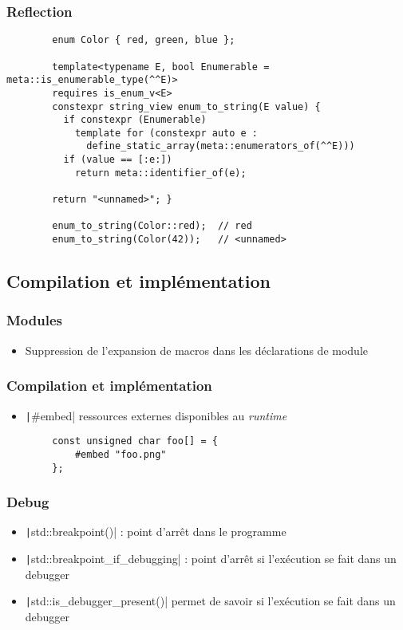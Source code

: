 \documentclass[C++.tex]{subfiles}
\begin{document}
\begin{frame}[fragile]
	\frametitle{Reflection}
	\begin{verbatim}
		enum Color { red, green, blue };

		template<typename E, bool Enumerable = meta::is_enumerable_type(^^E)>
		requires is_enum_v<E>
		constexpr string_view enum_to_string(E value) {
		  if constexpr (Enumerable)
		    template for (constexpr auto e :
		      define_static_array(meta::enumerators_of(^^E)))
		  if (value == [:e:])
		    return meta::identifier_of(e);

		return "<unnamed>"; }

		enum_to_string(Color::red);  // red
		enum_to_string(Color(42));   // <unnamed>
	\end{verbatim}
\end{frame}

\subsection*{Compilation et implémentation}
\begin{frame}[fragile]
	\frametitle{Modules}
	\begin{itemize}
		\item Suppression de l'expansion de macros dans les déclarations de module
	\end{itemize}

\end{frame}

\begin{frame}[fragile]
	\frametitle{Compilation et implémentation}
	\begin{itemize}
		\item \texttt|#embed| ressources externes disponibles au \textit{runtime}
	\end{itemize}

	\begin{verbatim}
		const unsigned char foo[] = {
			#embed "foo.png"
		};
	\end{verbatim}

\end{frame}

\begin{frame}[fragile]
	\frametitle{Debug}
	\begin{itemize}
		\item \texttt|std::breakpoint()| : point d'arrêt dans le programme
		\item \texttt|std::breakpoint_if_debugging| : point d'arrêt si l'exécution se fait dans un debugger
		\item \texttt|std::is_debugger_present()| permet de savoir si l'exécution se fait dans un debugger
	\end{itemize}

\end{frame}
\end{document}
